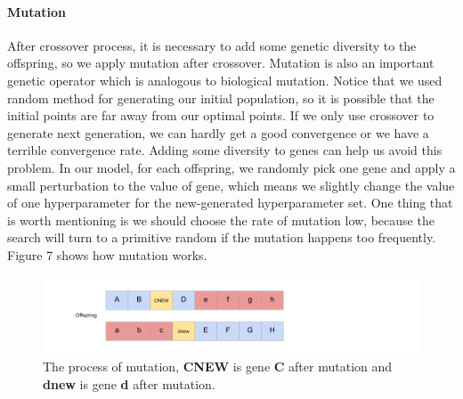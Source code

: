 \documentclass[12pt]{article}
\begin{document}
\paragraph{Mutation}
After crossover process, it is necessary to add some genetic diversity to the offspring, so we apply mutation after crossover. Mutation is also an important genetic operator which is analogous to biological mutation. Notice that we used random method for generating our initial population, so it is possible that the initial points are far away from our optimal points. If we only use crossover to generate next generation, we can hardly get a good convergence or we have a terrible convergence rate. Adding some diversity to genes can help us avoid this problem. In our model, for each offspring, we randomly pick one gene and apply a small perturbation to the value of gene, which means we slightly change the value of one hyperparameter for the new-generated hyperparameter set. One thing that is worth mentioning is we should choose the rate of mutation low, because the search will turn to a primitive random if the mutation happens too frequently. Figure 7 shows how mutation works.
\begin{figure}
\begin{center}
\includegraphics[width =7.2in]{mutation.png}
\caption{The process of mutation, \textbf{CNEW} is gene \textbf{C} after mutation and \textbf{dnew} is gene \textbf{d} after mutation.}
\end{center}
\label{fig:pic6}
\end{figure}
\end{document}
